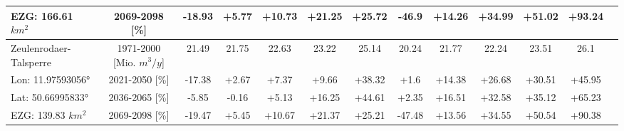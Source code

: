 \begin{longtable}{@{\extracolsep{\fill}}lc|ccccc||cccccc}
EZG: 166.61 $km^2$ & 2069-2098 [\%]  & -18.93 & +5.77 & +10.73 & +21.25 & +25.72 & -46.9 & +14.26 & +34.99 & +51.02 & +93.24 & \\ 
\hline 
Zeulenrodaer-Talsperre & 1971-2000 [Mio. $m^3/y$]  & 21.49 & 21.75 & 22.63 & 23.22 & 25.14 & 20.24 & 21.77 & 22.24 & 23.51 & 26.1 & \\ 
\cline{2-13} 
Lon: 11.97593056° & 2021-2050 [\%]  & -17.38 & +2.67 & +7.37 & +9.66 & +38.32 & +1.6 & +14.38 & +26.68 & +30.51 & +45.95 & \\ 
Lat: 50.66995833° & 2036-2065 [\%]  & -5.85 & -0.16 & +5.13 & +16.25 & +44.61 & +2.35 & +16.51 & +32.58 & +35.12 & +65.23 & \\ 
EZG: 139.83 $km^2$ & 2069-2098 [\%]  & -19.47 & +5.45 & +10.67 & +21.37 & +25.21 & -47.48 & +13.56 & +34.55 & +50.54 & +90.38 & \\\hline
\end{longtable}
\addtolength{\tabcolsep}{5.9pt}
